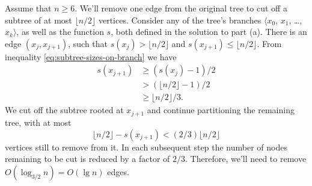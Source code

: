 Assume that $n\ge6$.
We'll remove one edge from the original tree to cut off a subtree of at most $\lfloor n/2\rfloor$ vertices.
Consider any of the tree's branches $\langle x_0$, $x_1$, \dots, $x_k\rangle$, as well as the function $s$, both defined in the solution to part (a).
There is an edge $(x_j,x_{j+1})$, such that $s(x_j)>\lfloor n/2\rfloor$ and $s(x_{j+1})\le\lfloor n/2\rfloor$.
From inequality \eqref{eq:subtree-sizes-on-branch} we have
\begin{align*}
    s(x_{j+1}) &\ge (s(x_j)-1)/2 \\
    &> (\lfloor n/2\rfloor-1)/2 \\
    &\ge \lfloor n/2\rfloor/3.
\end{align*}
We cut off the subtree rooted at $x_{j+1}$ and continue partitioning the remaining tree, with at most
\[
    \lfloor n/2\rfloor-s(x_{j+1}) < (2/3)\lfloor n/2\rfloor
\]
vertices still to remove from it.
In each subsequent step the number of nodes remaining to be cut is reduced by a factor of $2/3$.
Therefore, we'll need to remove $O(\log_{3/2}n)=O(\lg n)$ edges.
